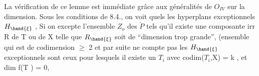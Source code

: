 La vérification de ce lemme est immédiate grâce aux généralités
de $O_{IV}$ sur la dimension. Sous les conditions de 8.4., on voit  quels 
les hyperplans exceptionnels $H_{\hand{\xi}}$ 
, Si
on excepte l'ensemble $Z_o$ des \hand{$\xi\in$} $\check{P}$ tels qu'il existe une composante
irr R de T ou de X telle  que $R_{\hand{\xi}}$ soit de ``dimension trop grande'',
 (ensemble qui est de codimension $\geq$ 2 et par suite ne compte pas
les $H_{\hand{\xi}}$  exceptionnels sont ceux pour lesquels il existe
un $T_i$ avec codim($T_i$,X) = k , et  dim f(T ) = 0,

